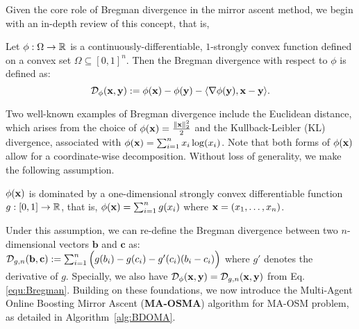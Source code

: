 Given the core role of Bregman divergence in the mirror ascent method, we begin with an in-depth
review of this concept, that is, 
	\begin{definition}
		Let $\phi: \Omega\rightarrow\mathbb{R}$ is a continuously-differentiable, $1$-strongly convex function defined on a convex set  $\Omega\subseteq[0,1]^{n}$. Then the Bregman divergence with respect to $\phi$ is defined as:
  \vspace{-0.1em}
	\begin{equation}\label{equ:Bregman}
\mathcal{D}_{\phi}(\mathbf{x},\mathbf{y}): =\phi(\mathbf{x})-\phi(\mathbf{y})-\langle\nabla\phi(\mathbf{y}),\mathbf{x}-\mathbf{y}\rangle.
		\end{equation}
	\end{definition}
	\vspace{-0.1em}
	Two well-known examples of Bregman divergence include the Euclidean distance, which arises from the choice of $\phi(\mathbf{x})=\frac{\|\mathbf{x}\|_{2}^{2}}{2}$ and the Kullback-Leibler (KL) divergence, associated with $\phi(\mathbf{x})=\sum_{i=1}^{n}x_{i}\log(x_{i})$. Note that both forms of $\phi(\mathbf{x})$ allow for a coordinate-wise decomposition. Without loss of generality, we make the following assumption.\vspace{-0.3em}
	\begin{assumption}\label{ass:2} $\phi(\mathbf{x})$ is dominated by a one-dimensional strongly convex differentiable function $g:[0,1]\rightarrow\mathbb{R}$, that is, $\phi(\mathbf{x})=\sum_{i=1}^{n}g(x_{i})$ where $\mathbf{x}=(x_{1},\dots,x_{n})$.
	\end{assumption}\vspace{-0.3em}
	Under this assumption, we can re-define the Bregman divergence between two $n$-dimensional vectors $\mathbf{b}$ and $\mathbf{c}$ as: $\mathcal{D}_{g,n}(\mathbf{b},\mathbf{c}):=\sum_{i=1}^{n}\Big(g(b_{i})-g(c_{i})-g'(c_{i})(b_{i}-c_{i})\Big)$ where $g'$ denotes the derivative of $g$. Specially, we also have $\mathcal{D}_{\phi}(\mathbf{x},\mathbf{y})=\mathcal{D}_{g,n}(\mathbf{x},\mathbf{y})$ from Eq.\eqref{equ:Bregman}. Building on these foundations, we now introduce the Multi-Agent Online Boosting Mirror Ascent (\textbf{MA-OSMA}) algorithm for MA-OSM problem, as detailed in Algorithm~\ref{alg:BDOMA}.
	
